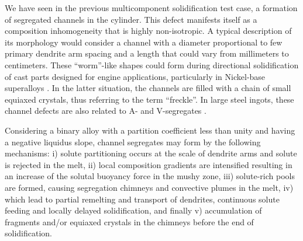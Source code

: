 We have seen in the previous multicomponent solidification test case, a formation of segregated channels in the cylinder. 
This defect manifests itself as a composition inhomogeneity that is highly non-isotropic. A typical description of its 
morphology would consider a channel with a diameter proportional to few primary dendrite arm spacing and a length that 
could vary from millimeters to centimeters. These “worm”-like shapes could form during directional solidification of cast 
parts designed for engine applications, particularly in Nickel-base superalloys \citep{giamei_nature_1970,beckermann_development_2000,
genereux_characterization_2000,schneider_modeling_1997}. In the latter situation, the channels are filled with a chain of small equiaxed 
crystals, thus referring to the term “freckle”. In large steel ingots, these channel defects are also related to A- and V-segregates   
\citep{pickering_macrosegregation_2013}. 

Considering a binary alloy with a partition coefficient less than unity and having a negative liquidus slope, 
channel segregates may form by the following mechanisms: i) solute partitioning occurs at the scale of dendrite arms and 
solute is rejected in the melt, ii) local composition gradients are intensified resulting in an increase of the 
solutal buoyancy force in the mushy zone, iii) solute-rich pools are formed, causing segregation chimneys and convective plumes in the melt, 
iv) which lead to partial remelting and transport of dendrites, continuous solute feeding and locally delayed solidification,
and finally v) accumulation of fragments and/or equiaxed crystals in the chimneys before the end of solidification.


